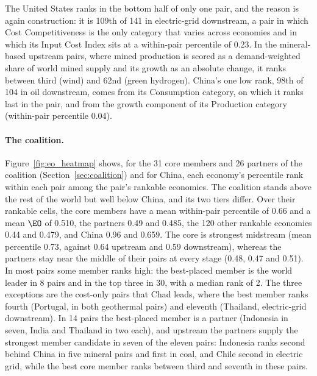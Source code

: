 The United States ranks in the bottom half of only one pair, and the reason is again
construction: it is 109th of 141 in electric-grid downstream, a pair in which Cost
Competitiveness is the only category that varies across economies and in which its Input Cost
Index sits at a within-pair percentile of 0.23. In the mineral-based upstream pairs, where mined
production is scored as a demand-weighted share of world mined supply and its growth as an
absolute change, it ranks between third (wind) and 62nd (green hydrogen). China's one low rank, 98th of 104
in oil downstream, comes from its Consumption category, on which it ranks last in the pair, and
from the growth component of its Production category (within-pair percentile 0.04).

\paragraph{The coalition.} Figure~\ref{fig:eo_heatmap} shows, for the 31 core members and 26
partners of the coalition (Section~\ref{sec:coalition}) and for China, each economy's percentile
rank within each pair among the pair's rankable economies. The coalition stands above the rest of
the world but well below China, and its two tiers differ. Over their rankable cells, the core
members have a mean within-pair percentile of 0.66 and a mean $\EO$ of 0.510, the partners 0.49
and 0.485, the 120 other rankable economies 0.44 and 0.479, and China 0.96 and 0.659. The core is
strongest midstream (mean percentile 0.73, against 0.64 upstream and 0.59 downstream), whereas the
partners stay near the middle of their pairs at every stage (0.48, 0.47 and 0.51). In most pairs
some member ranks high: the best-placed member is the world leader in 8 pairs and in the top three
in 30, with a median rank of 2. The three exceptions are the cost-only pairs that Chad leads, where
the best member ranks fourth (Portugal, in both geothermal pairs) and eleventh (Thailand,
electric-grid downstream). In 14 pairs the best-placed member is a partner (Indonesia in seven,
India and Thailand in two each), and upstream the partners supply the strongest member candidate
in seven of the eleven pairs: Indonesia ranks second behind China in five mineral pairs and first
in coal, and Chile second in electric grid, while the best core member ranks between third and
seventh in these pairs.

